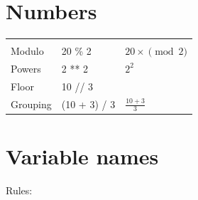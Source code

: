 \section{Numbers}
\begin{center}
    \begin{tabular}{ |p{5cm}|p{5cm}|p{5cm}| }
        \hline\\[0.25cm]
            Modulo & 20 \% 2 & $\displaystyle 20\times\pmod{2}$  \\[0.45cm]
            \hline
            Powers & 2 ** 2  & $\displaystyle 2^2$  \\[0.45cm]
            \hline
            Floor & 10 // 3  & 
              \\[0.45cm]
            \hline
            Grouping & (10 + 3) / 3 & $\displaystyle \frac{10+3}{3} $ \\[0.45cm] 
        \hline
    \end{tabular}
\end{center}

\section{Variable names}
Rules: 
